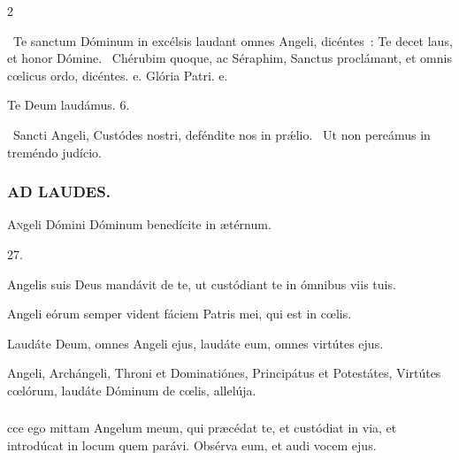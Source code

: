 \documentclass[9pt,twoside]{extarticle}
\begin{document}
\begin{multicols}{2}
{{{\begin{tightlist}{}
\item {}~Te sanctum Dóminum in excélsis laudant omnes Angeli, dicéntes~: \textred{*} Te decet laus, et honor Dómine. ~Chérubim quoque, ac Séraphim, Sanctus proclámant, et omnis cœlicus ordo, dicéntes. e. Glória Patri. e.
\item Te Deum laudámus. 6.
\item {}~Sancti Angeli, Custódes nostri, deféndite nos in prǽlio. ~Ut non pereámus in treméndo judício.
\end{tightlist}

\subsubsection*{\center \textsc{AD LAUDES.}}
\begin{center}\end{center}
\lettrine{A}ngeli Dómini Dóminum benedícite in ætérnum.

\begin{tightlist}{}
\item {} 27.
\item {} Angelis suis Deus mandávit de te, ut custódiant te in ómnibus viis tuis.
\item {} Angeli eórum semper vident fáciem Patris mei, qui est in cœlis.
\item {} Laudáte Deum, omnes Angeli ejus, laudáte eum, omnes virtútes ejus.
\item {} Angeli, Archángeli, Throni et Dominatiónes, Principátus et Potestátes, Virtútes cœlórum, laudáte Dóminum de cœlis, allelúja.
\end{tightlist}

\subsubsection*{}
cce ego mittam Angelum meum, qui præcédat te, et custódiat in via, et introdúcat in locum quem parávi. Obsérva eum, et audi vocem ejus.

}}}
\end{multicols}
\end{document}
